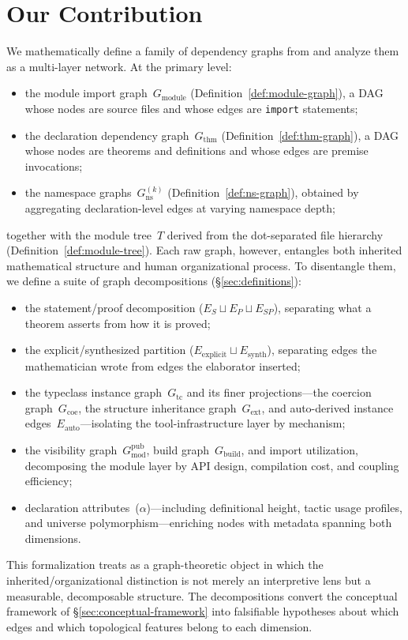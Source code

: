 \section{Our Contribution}
\label{sec:contribution}

We mathematically define a family of dependency graphs from  and analyze them as a multi-layer network. At the primary level:
\begin{itemize}
    \item the module import graph~$G_{\mathrm{module}}$ (Definition~\ref{def:module-graph}), a DAG whose nodes are source files and whose edges are \texttt{import} statements;
    \item the declaration dependency graph~$G_{\mathrm{thm}}$ (Definition~\ref{def:thm-graph}), a DAG whose nodes are theorems and definitions and whose edges are premise invocations;
    \item the namespace graphs~$G_{\mathrm{ns}}^{(k)}$ (Definition~\ref{def:ns-graph}), obtained by aggregating declaration-level edges at varying namespace depth;
\end{itemize}
together with the module tree~$T$ derived from the dot-separated file hierarchy (Definition~\ref{def:module-tree}). Each raw graph, however, entangles both inherited mathematical structure and human organizational process. To disentangle them, we define a suite of graph decompositions (\S\ref{sec:definitions}):
\begin{itemize}
    \item the statement/proof decomposition ($E_S \sqcup E_P \sqcup E_{SP}$), separating what a theorem asserts from how it is proved;
    \item the explicit/synthesized partition ($E_{\mathrm{explicit}} \sqcup E_{\mathrm{synth}}$), separating edges the mathematician wrote from edges the elaborator inserted;
    \item the typeclass instance graph~$G_{\mathrm{tc}}$ and its finer projections---the coercion graph~$G_{\mathrm{coe}}$, the structure inheritance graph~$G_{\mathrm{ext}}$, and auto-derived instance edges~$E_{\mathrm{auto}}$---isolating the tool-infrastructure layer by mechanism;
    \item the visibility graph~$G_{\mathrm{mod}}^{\mathrm{pub}}$, build graph~$G_{\mathrm{build}}$, and import utilization, decomposing the module layer by API design, compilation cost, and coupling efficiency;
    \item declaration attributes~($\alpha$)---including definitional height, tactic usage profiles, and universe polymorphism---enriching nodes with metadata spanning both dimensions.
\end{itemize}
This formalization treats  as a graph-theoretic object in which the inherited/organizational distinction is not merely an interpretive lens but a measurable, decomposable structure. The decompositions convert the conceptual framework of \S\ref{sec:conceptual-framework} into falsifiable hypotheses about which edges and which topological features belong to each dimension.

